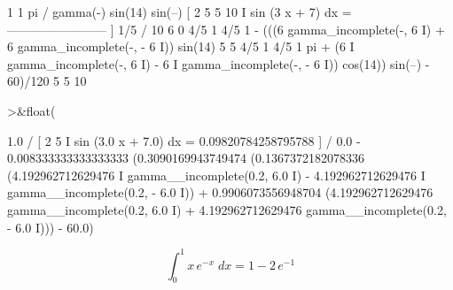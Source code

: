 \documentclass[a4paper,11pt,oneside,enabledeprecatedfontcommands]{scrbook}
\newenvironment{eulernotebook}{}{}
\newenvironment{eulerformula}{}{}
\begin{document}
\begin{eulernotebook}
\begin{euleroutput}
           1                           1              pi
          /                      gamma(-) sin(14) sin(--)
          [     2    5                 5              10
          I  sin (3 x  + 7) dx = ------------------------
          ]                                  1/5
          /                              10 6
           0
         4/5                  1          4/5                  1
   - (((6    gamma_incomplete(-, 6 I) + 6    gamma_incomplete(-, - 6 I)) sin(14)
                              5                               5
       4/5                    1          4/5                    1                       pi
   + (6    I gamma_incomplete(-, 6 I) - 6    I gamma_incomplete(-, - 6 I)) cos(14)) sin(--) - 60)/120
                              5                                 5                       10
  
\end{euleroutput}
\begin{eulerprompt}
>&float(%
\end{eulerprompt}
\begin{euleroutput}
  
           1.0
          /
          [       2      5
          I    sin (3.0 x  + 7.0) dx = 0.09820784258795788
          ]
          /
           0.0
   - 0.008333333333333333 (0.3090169943749474 (0.1367372182078336
   (4.192962712629476 I gamma__incomplete(0.2, 6.0 I)
   - 4.192962712629476 I gamma__incomplete(0.2, - 6.0 I))
   + 0.9906073556948704 (4.192962712629476 gamma__incomplete(0.2, 6.0 I)
   + 4.192962712629476 gamma__incomplete(0.2, - 6.0 I))) - 60.0)
  
\end{euleroutput}
\begin{eulerformula}
\[
\int_{0}^{1}{x\,e^ {- x }\;dx}=1-2\,e^ {- 1 }
\]
\end{eulerformula}


\end{eulernotebook}
\end{document}
